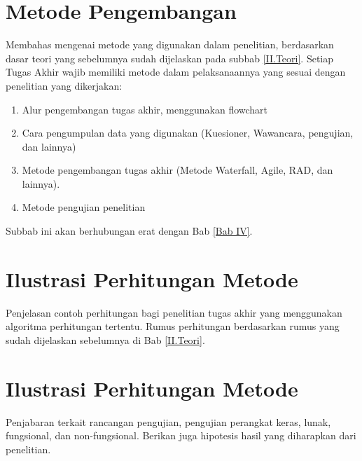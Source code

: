 \section{Metode Pengembangan} \label{III.Metode}
Membahas mengenai metode yang digunakan dalam penelitian, berdasarkan dasar teori yang sebelumnya sudah dijelaskan pada subbab \ref{II.Teori}. Setiap Tugas Akhir wajib memiliki metode dalam pelaksanaannya yang sesuai dengan penelitian yang dikerjakan: \par
\begin{enumerate}[noitemsep]
	\item Alur pengembangan tugas akhir, menggunakan flowchart
	\item Cara pengumpulan data yang digunakan (Kuesioner, Wawancara, pengujian, dan lainnya)
	\item Metode pengembangan tugas akhir (Metode Waterfall, Agile, RAD, dan lainnya).
	\item Metode pengujian penelitian
\end{enumerate}
Subbab ini akan berhubungan erat dengan Bab \ref{Bab IV}. \par

\section{Ilustrasi Perhitungan Metode} \label{III.Ilustrasi}
Penjelasan contoh perhitungan bagi penelitian tugas akhir yang menggunakan algoritma perhitungan tertentu. Rumus perhitungan berdasarkan rumus yang sudah dijelaskan sebelumnya di Bab \ref{II.Teori}. \par

\section{Ilustrasi Perhitungan Metode} \label{III.Uji}
Penjabaran terkait rancangan pengujian, pengujian perangkat keras, lunak, fungsional, dan non-fungsional. Berikan juga hipotesis hasil yang diharapkan dari penelitian. \par
